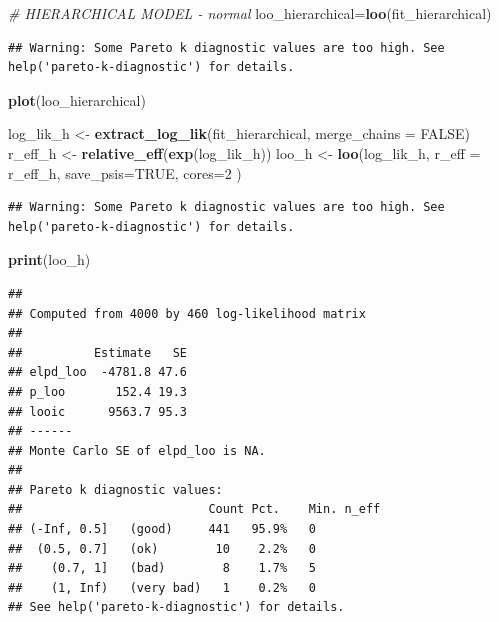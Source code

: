 \documentclass[]{article}
\newenvironment{Shaded}{\begin{snugshade}}{\end{snugshade}}
\newcommand{\KeywordTok}[1]{\textcolor[rgb]{0.13,0.29,0.53}{\textbf{#1}}}
\newcommand{\DataTypeTok}[1]{\textcolor[rgb]{0.13,0.29,0.53}{#1}}
\newcommand{\DecValTok}[1]{\textcolor[rgb]{0.00,0.00,0.81}{#1}}
\newcommand{\StringTok}[1]{\textcolor[rgb]{0.31,0.60,0.02}{#1}}
\newcommand{\CommentTok}[1]{\textcolor[rgb]{0.56,0.35,0.01}{\textit{#1}}}
\newcommand{\OtherTok}[1]{\textcolor[rgb]{0.56,0.35,0.01}{#1}}
\newcommand{\NormalTok}[1]{#1}
\begin{document}
\begin{Shaded}
\begin{Highlighting}[]
\CommentTok{# HIERARCHICAL MODEL - normal}
\NormalTok{loo_hierarchical=}\KeywordTok{loo}\NormalTok{(fit_hierarchical)}
\end{Highlighting}
\end{Shaded}

\begin{verbatim}
## Warning: Some Pareto k diagnostic values are too high. See help('pareto-k-diagnostic') for details.
\end{verbatim}

\begin{Shaded}
\begin{Highlighting}[]
\KeywordTok{plot}\NormalTok{(loo_hierarchical)}

\NormalTok{log_lik_h <-}\StringTok{ }\KeywordTok{extract_log_lik}\NormalTok{(fit_hierarchical, }\DataTypeTok{merge_chains =} \OtherTok{FALSE}\NormalTok{)}
\NormalTok{r_eff_h <-}\StringTok{ }\KeywordTok{relative_eff}\NormalTok{(}\KeywordTok{exp}\NormalTok{(log_lik_h))}
\NormalTok{loo_h <-}\StringTok{ }\KeywordTok{loo}\NormalTok{(log_lik_h, }\DataTypeTok{r_eff =}\NormalTok{ r_eff_h, }\DataTypeTok{save_psis=}\OtherTok{TRUE}\NormalTok{, }\DataTypeTok{cores=}\DecValTok{2}\NormalTok{ )}
\end{Highlighting}
\end{Shaded}

\begin{verbatim}
## Warning: Some Pareto k diagnostic values are too high. See help('pareto-k-diagnostic') for details.
\end{verbatim}

\begin{Shaded}
\begin{Highlighting}[]
\KeywordTok{print}\NormalTok{(loo_h)}
\end{Highlighting}
\end{Shaded}

\begin{verbatim}
## 
## Computed from 4000 by 460 log-likelihood matrix
## 
##          Estimate   SE
## elpd_loo  -4781.8 47.6
## p_loo       152.4 19.3
## looic      9563.7 95.3
## ------
## Monte Carlo SE of elpd_loo is NA.
## 
## Pareto k diagnostic values:
##                          Count Pct.    Min. n_eff
## (-Inf, 0.5]   (good)     441   95.9%   0         
##  (0.5, 0.7]   (ok)        10    2.2%   0         
##    (0.7, 1]   (bad)        8    1.7%   5         
##    (1, Inf)   (very bad)   1    0.2%   0         
## See help('pareto-k-diagnostic') for details.
\end{verbatim}
\end{document}
